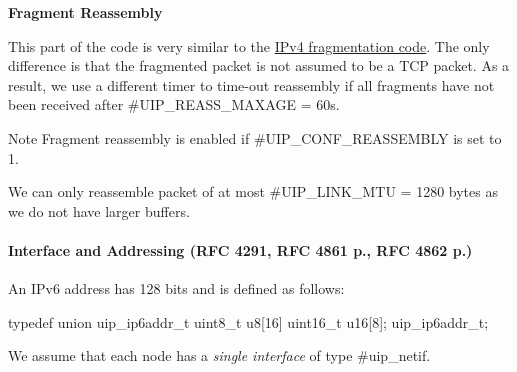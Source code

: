 {\bfseries \-Fragment \-Reassembly}\par
 \-This part of the code is very similar to the \hyperlink{a00060_ipreass}{\-I\-Pv4 fragmentation code}. \-The only difference is that the fragmented packet is not assumed to be a \-T\-C\-P packet. \-As a result, we use a different timer to time-\/out reassembly if all fragments have not been received after \#\-U\-I\-P\-\_\-\-R\-E\-A\-S\-S\-\_\-\-M\-A\-X\-A\-G\-E = 60s. \begin{DoxyNote}{\-Note}
\-Fragment reassembly is enabled if \#\-U\-I\-P\-\_\-\-C\-O\-N\-F\-\_\-\-R\-E\-A\-S\-S\-E\-M\-B\-L\-Y is set to 1. 

\-We can only reassemble packet of at most \#\-U\-I\-P\-\_\-\-L\-I\-N\-K\-\_\-\-M\-T\-U = 1280 bytes as we do not have larger buffers.
\end{DoxyNote}
\hypertarget{a00061_address}{}\paragraph{\-Interface and Addressing (\-R\-F\-C 4291, R\-F\-C 4861 p., R\-F\-C 4862 p.)}\label{a00061_address}
\-An \-I\-Pv6 address has 128 bits and is defined as follows\-: 
\begin{DoxyCode}
typedef union uip_ip6addr_t {
  uint8_t  u8[16]
  uint16_t u16[8];
} uip_ip6addr_t;
\end{DoxyCode}


\-We assume that each node has a {\itshape single interface\/} of type \#uip\-\_\-netif.

